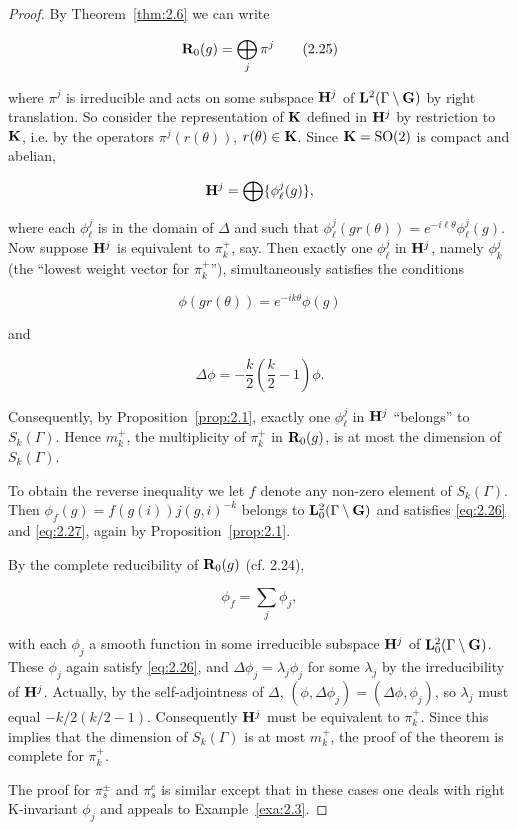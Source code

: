 \begin{proof}

By Theorem~\ref{thm:2.6} we can write

\begin{equation}\label{eq:2.25}
\mathbf{R}_0(g) = \bigoplus_j \pi^{j}\tag{2.25}
\end{equation}

where $\pi^{j}$ is irreducible and acts on some subspace $\mathbf{H}^{j}$ of $\mathbf{L}^2(\Gamma \setminus \mathbf{G})$ by right translation. So consider the representation of $\mathbf{K}$ defined in $\mathbf{H}^{j}$ by restriction to $\mathbf{K}$, i.e. by the operators $\pi^{j}(r(\theta))$, $r(\theta) \in \mathbf{K}$. Since $\mathbf{K} = \operatorname{SO}(2)$ is compact and abelian,

\[
\mathbf{H}^{j} = \bigoplus \{\phi_{\ell}^{j}(g)\},
\]

where each $\phi_{\ell}^{j}$ is in the domain of $\Delta$ and such that $\phi_{\ell}^{j}(gr(\theta)) = e^{-i\ell\theta}\phi_{\ell}^{j}(g)$. Now suppose $\mathbf{H}^{j}$ is equivalent to $\pi_k^{+}$, say. Then exactly one $\phi_{\ell}^{j}$ in $\mathbf{H}^{j}$, namely $\phi_k^{j}$ (the ``lowest weight vector for $\pi_k^{+}$''), simultaneously satisfies the conditions

\begin{equation}\label{eq:2.26}
\phi(gr(\theta)) = e^{-ik\theta}\phi(g)\tag{2.26}
\end{equation}

and

\begin{equation}\label{eq:2.27}
\Delta\phi = -\frac{k}{2}\left(\frac{k}{2} - 1\right)\phi.\tag{2.27}
\end{equation}

Consequently, by Proposition~\ref{prop:2.1}, exactly one $\phi_{\ell}^{j}$ in $\mathbf{H}^{j}$ ``belongs'' to $S_k(\Gamma)$. Hence $m_k^{+}$, the multiplicity of $\pi_k^{+}$ in $\mathbf{R}_0(g)$, is at most the dimension of $S_k(\Gamma)$.

To obtain the reverse inequality we let $f$ denote any non-zero element of $S_k(\Gamma)$. Then $\phi_f(g) = f(g(i))j(g,i)^{-k}$ belongs to $\mathbf{L}_0^2(\Gamma \setminus \mathbf{G})$ and satisfies \eqref{eq:2.26} and \eqref{eq:2.27}, again by Proposition~\ref{prop:2.1}.

By the complete reducibility of $\mathbf{R}_0(g)$ (cf. 2.24),

\[
\phi_f = \sum_j \phi_j,
\]

with each $\phi_j$ a smooth function in some irreducible subspace $\mathbf{H}^{j}$ of $\mathbf{L}_0^2(\Gamma \setminus \mathbf{G})$. These $\phi_j$ again satisfy \eqref{eq:2.26}, and $\Delta\phi_j = \lambda_j\phi_j$ for some $\lambda_j$ by the irreducibility of $\mathbf{H}^{j}$. Actually, by the self-adjointness of $\Delta$, $(\phi, \Delta\phi_j) = (\Delta\phi, \phi_j)$, so $\lambda_j$ must equal $-k/2(k/2 - 1)$. Consequently $\mathbf{H}^{j}$ must be equivalent to $\pi_k^{+}$. Since this implies that the dimension of $S_k(\Gamma)$ is at most $m_k^{+}$, the proof of the theorem is complete for $\pi_k^{+}$.

The proof for $\pi_s^{\pm}$ and $\pi_s^{c}$ is similar except that in these cases one deals with right K-invariant $\phi_j$ and appeals to Example~\ref{exa:2.3}.

\end{proof}

